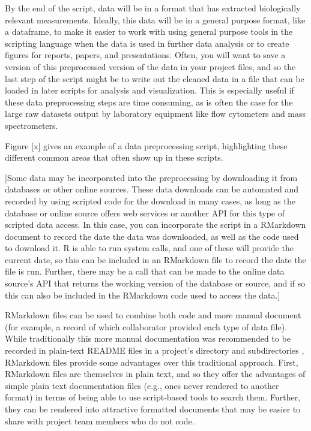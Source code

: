 \documentclass[]{tufte-book}
\begin{document}
By the end of the script, data will be in a format that has extracted
biologically relevant measurements. Ideally, this data will be in a general
purpose format, like a dataframe, to make it easier to work with using general
purpose tools in the scripting language when the data is used in further data
analysis or to create figures for reports, papers, and presentations. Often, you
will want to save a version of this preprocessed version of the data in your
project files, and so the last step of the script might be to write out the
cleaned data in a file that can be loaded in later scripts for analysis and
visualization. This is especially useful if these data preprocessing steps are
time consuming, as is often the case for the large raw datasets output by
laboratory equipment like flow cytometers and mass spectrometers.

Figure {[}x{]} gives an example of a data preprocessing script, highlighting these
different common areas that often show up in these scripts.

{[}Some data may be incorporated into the preprocessing by downloading it from
databases or other online sources. These data downloads can be automated and
recorded by using scripted code for the download in many cases, as long as the
database or online source offers web services or another API for this type of
scripted data access. In this case, you can incorporate the script in a
RMarkdown document to record the date the data was downloaded, as well as the
code used to download it. R is able to run system calls, and one of these
will provide the current date, so this can be included in an RMarkdown file
to record the date the file is run. Further, there may be a call that can
be made to the online data source's API that returns the working version of
the database or source, and if so this can also be included in the RMarkdown
code used to access the data.{]}

RMarkdown files can be used to combine both code and more manual document
(for example, a record of which collaborator provided each type of data file).
While traditionally this more manual documentation was recommended to be
recorded in plain-text README files in a project's directory and subdirectories
\citep{buffalo2015bioinformatics}, RMarkdown files provide some advantages over
this traditional approach. First, RMarkdown files are themselves in plain
text, and so they offer the advantages of simple plain text documentation
files (e.g., ones never rendered to another format) in terms of being able
to use script-based tools to search them. Further, they can be rendered into
attractive formatted documents that may be easier to share with project
team members who do not code.
\end{document}
